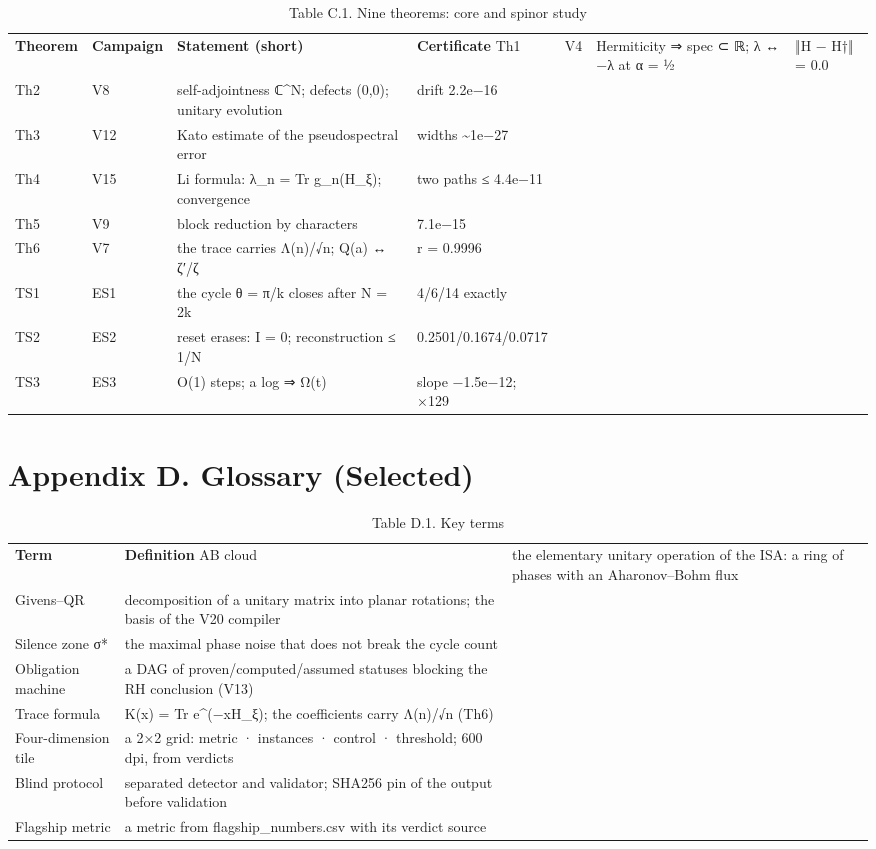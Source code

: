 \documentclass[11pt,a4paper]{article}
\begin{document}
\begin{table}[htbp]\centering\small
\caption{Table C.1. Nine theorems: core and spinor study}
\begin{tabular}{p{} p{} p{} p{}}
\toprule
\textbf{Theorem} & \textbf{Campaign} & \textbf{Statement (short)} & \textbf{Certificate}
\midrule
Th1 & V4 & Hermiticity ⇒ spec ⊂ ℝ; λ ↔ −λ at α = ½ & ‖H − H†‖ = 0.0 \\
Th2 & V8 & self-adjointness ℂ\textasciicircum{}N; defects (0,0); unitary evolution & drift 2.2e−16 \\
Th3 & V12 & Kato estimate of the pseudospectral error & widths \textasciitilde{}1e−27 \\
Th4 & V15 & Li formula: λ\_n = Tr g\_n(H\_ξ); convergence & two paths ≤ 4.4e−11 \\
Th5 & V9 & block reduction by characters & 7.1e−15 \\
Th6 & V7 & the trace carries Λ(n)/√n; Q(a) ↔ ζ′/ζ & r = 0.9996 \\
TS1 & ES1 & the cycle θ = π/k closes after N = 2k & 4/6/14 exactly \\
TS2 & ES2 & reset erases: I = 0; reconstruction ≤ 1/N & 0.2501/0.1674/0.0717 \\
TS3 & ES3 & O(1) steps; a log ⇒ Ω(t) & slope −1.5e−12; ×129 \\
\bottomrule
\end{tabular}
\end{table}

\section{Appendix D. Glossary (Selected)}

\begin{table}[htbp]\centering\small
\caption{Table D.1. Key terms}
\begin{tabular}{p{} p{}}
\toprule
\textbf{Term} & \textbf{Definition}
\midrule
AB cloud & the elementary unitary operation of the ISA: a ring of phases with an Aharonov–Bohm flux \\
Givens–QR & decomposition of a unitary matrix into planar rotations; the basis of the V20 compiler \\
Silence zone σ* & the maximal phase noise that does not break the cycle count \\
Obligation machine & a DAG of proven/computed/assumed statuses blocking the RH conclusion (V13) \\
Trace formula & K(x) = Tr e\textasciicircum{}(−xH\_ξ); the coefficients carry Λ(n)/√n (Th6) \\
Four-dimension tile & a 2×2 grid: metric · instances · control · threshold; 600 dpi, from verdicts \\
Blind protocol & separated detector and validator; SHA256 pin of the output before validation \\
Flagship metric & a metric from flagship\_numbers.csv with its verdict source \\
\bottomrule
\end{tabular}
\end{table}
\end{document}
